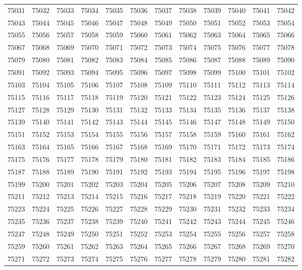 \begin{center}
\begin{longtable}{llllllllllll}
75031 &75032 &75033 &75034 &75035 &75036 &75037 &75038 &75039 &75040 &75041 &75042 \\
75043 &75044 &75045 &75046 &75047 &75048 &75049 &75050 &75051 &75052 &75053 &75054 \\
75055 &75056 &75057 &75058 &75059 &75060 &75061 &75062 &75063 &75064 &75065 &75066 \\
75067 &75068 &75069 &75070 &75071 &75072 &75073 &75074 &75075 &75076 &75077 &75078 \\
75079 &75080 &75081 &75082 &75083 &75084 &75085 &75086 &75087 &75088 &75089 &75090 \\
75091 &75092 &75093 &75094 &75095 &75096 &75097 &75098 &75099 &75100 &75101 &75102 \\
75103 &75104 &75105 &75106 &75107 &75108 &75109 &75110 &75111 &75112 &75113 &75114 \\
75115 &75116 &75117 &75118 &75119 &75120 &75121 &75122 &75123 &75124 &75125 &75126 \\
75127 &75128 &75129 &75130 &75131 &75132 &75133 &75134 &75135 &75136 &75137 &75138 \\
75139 &75140 &75141 &75142 &75143 &75144 &75145 &75146 &75147 &75148 &75149 &75150 \\
75151 &75152 &75153 &75154 &75155 &75156 &75157 &75158 &75159 &75160 &75161 &75162 \\
75163 &75164 &75165 &75166 &75167 &75168 &75169 &75170 &75171 &75172 &75173 &75174 \\
75175 &75176 &75177 &75178 &75179 &75180 &75181 &75182 &75183 &75184 &75185 &75186 \\
75187 &75188 &75189 &75190 &75191 &75192 &75193 &75194 &75195 &75196 &75197 &75198 \\
75199 &75200 &75201 &75202 &75203 &75204 &75205 &75206 &75207 &75208 &75209 &75210 \\
75211 &75212 &75213 &75214 &75215 &75216 &75217 &75218 &75219 &75220 &75221 &75222 \\
75223 &75224 &75225 &75226 &75227 &75228 &75229 &75230 &75231 &75232 &75233 &75234 \\
75235 &75236 &75237 &75238 &75239 &75240 &75241 &75242 &75243 &75244 &75245 &75246 \\
75247 &75248 &75249 &75250 &75251 &75252 &75253 &75254 &75255 &75256 &75257 &75258 \\
75259 &75260 &75261 &75262 &75263 &75264 &75265 &75266 &75267 &75268 &75269 &75270 \\
75271 &75272 &75273 &75274 &75275 &75276 &75277 &75278 &75279 &75280 &75281 &75282 \\

\end{longtable}
\end{center}
